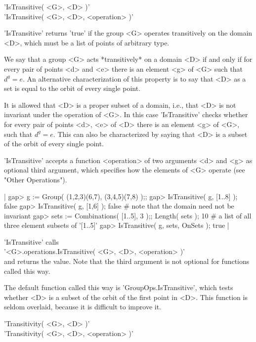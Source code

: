 
'IsTransitive( <G>, <D> )' \\
'IsTransitive( <G>, <D>, <operation> )'

'IsTransitive' returns 'true' if  the group  <G> operates transitively on
the domain <D>, which must be a list of points of arbitrary type.

We say that a  group <G> acts *transitively* on  a domain <D> if and only
if for every pair  of points <d>  and <e> there is  an element <g> of <G>
such that $d^g = e$.  An alternative characterization of this property is
to say that <D> as a set is equal to the orbit of every single point.

It is allowed that <D> is a proper subset of  a domain, i.e., that <D> is
not invariant under the  operation of  <G>.  In this  case 'IsTransitive'
checks  whether  for every pair  of  points  <d>, <e>  of <D> there is an
element <g> of  <G>, such that $d^g = e$.  This can also be characterized
by saying that <D> is a subset of the orbit of every single point.

'IsTransitive' accepts a  function <operation> of  two  arguments <d> and
<g> as  optional third argument, which specifies  how the elements of <G>
operate (see "Other Operations").

|    gap> g := Group( (1,2,3)(6,7), (3,4,5)(7,8) );;
    gap> IsTransitive( g, [1..8] );
    false
    gap> IsTransitive( g, [1,6] );
    false    # note that the domain need not be invariant
    gap> sets := Combinations( [1..5], 3 );;  Length( sets );
    10    # a list of all three element subsets of '[1..5]'
    gap> IsTransitive( g, sets, OnSets );
    true |

'IsTransitive' calls \\
'<G>.operations.IsTransitive( <G>, <D>, <operation> )' \\
and returns the value.  Note that the third argument is not  optional for
functions called this way.

The default function  called  this way is  'GroupOps.IsTransitive', which
tests  whether <D> is a subset  of the orbit  of  the first point in <D>.
This function is seldom overlaid, because it is difficult to improve it.


'Transitivity( <G>, <D> )' \\
'Transitivity( <G>, <D>, <operation> )'


